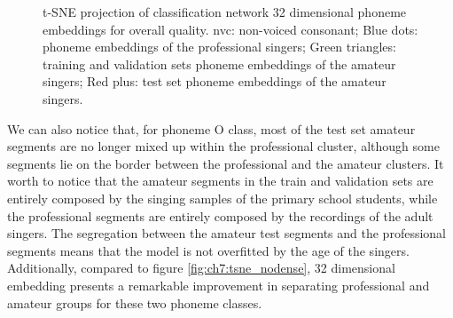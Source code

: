 \begin{figure}[ht!]
        \centering
            
        \caption[]{t-SNE projection of classification network 32 dimensional phoneme embeddings for overall quality. nvc: non-voiced consonant; Blue dots: phoneme embeddings of the professional singers; Green triangles: training and validation sets phoneme embeddings of the amateur singers; Red plus: test set phoneme embeddings of the amateur singers.}
        \label{fig:ch7:tsne_dense}
    \end{figure}

We can also notice that, for phoneme O class, most of the test set amateur segments are no longer mixed up within the professional cluster, although some segments lie on the border between the professional and the amateur clusters. It worth to notice that the amateur segments in the train and validation sets are entirely composed by the singing samples of the primary school students, while the professional segments are entirely composed by the recordings of the adult singers. The segregation between the amateur test segments and the professional segments means that the model is not overfitted by the age of the singers. Additionally, compared to figure \ref{fig:ch7:tsne_nodense}, 32 dimensional embedding presents a remarkable improvement in separating professional and amateur groups for these two phoneme classes.

